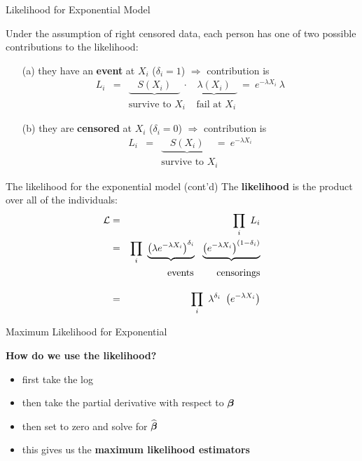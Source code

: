 \documentclass[envcountsect, 10pt, portrait, palatino]{beamer}
\newcommand{\bfbeta}{{\mbox{\boldmath$\beta$}}}
\begin{document}
\begin{frame}{Likelihood for Exponential Model}

Under the assumption of right censored data, each person has one of
two possible contributions to the likelihood:
\begin{itemize}
\item[(a)] they have an {\bf event} at $X_i$ ($\delta_i=1$) $\Rightarrow$
contribution is
\begin{eqnarray*}
L_i & = & \underbrace{~~~~S(X_i)~~~~}
~ \cdot ~ \underbrace{~~~\lambda(X_i)~~~}
~=~ e^{-\lambda X_i} ~ \lambda\\[1ex]
    &   & \mbox{survive to $X_i$} ~~~~~ \mbox{fail at $X_i$}
\end{eqnarray*}

\item[(b)] they are {\bf censored} at $X_i$ ($\delta_i=0$) $\Rightarrow$
contribution is
\begin{eqnarray*}
L_i & = & \underbrace{~~~~S(X_i)~~~~} ~=~ e^{-\lambda X_i}\\[1ex]
    &   & \mbox{survive to $X_i$}
\end{eqnarray*}
\end{itemize}
\end{frame}
\begin{frame}{The likelihood for the exponential model (cont'd)}
The {\bf likelihood} is the product over all of the individuals:
\begin{eqnarray*}
{\cal L} & = & \prod_i ~ L_i \\
& = & \prod_i ~\underbrace{\left(\lambda e^{-\lambda X_i}\right)^{\delta_i}}
  ~~ \underbrace{\left(e^{-\lambda X_i}\right)^{(1-\delta_i)}}\\
& & ~~~~~~~~\mbox{events} ~~~~~~~ \mbox{censorings}\\[2ex]
         & = & \prod_i ~\lambda^{\delta_i} ~\left(e^{-\lambda X_i}\right)
\end{eqnarray*}
\end{frame} 
\begin{frame}{Maximum Likelihood for Exponential}

\vspace{0.3in}
{\bf How do we use the likelihood?}
\begin{itemize}
\item first take the log
\item then take the partial derivative with respect to $\bfbeta$
\item then set to zero and solve for $\widehat\bfbeta$
\item this gives us the {\bf maximum likelihood estimators}
\end{itemize}
\end{frame}
\end{document}
